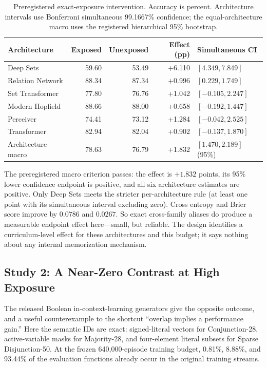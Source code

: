 \documentclass[twoside,11pt]{article}
\begin{document}
\begin{table}[t]
\caption{Preregistered exact-exposure intervention.  Accuracy is percent.
Architecture intervals use Bonferroni simultaneous 99.1667\% confidence; the
equal-architecture macro uses the registered hierarchical 95\% bootstrap.}
\label{tab:internal-models}
\centering
\small
\setlength{\tabcolsep}{5pt}
\begin{tabular}{lrrrl}
\toprule
Architecture & Exposed & Unexposed & Effect (pp) &
Simultaneous CI \\
\midrule
Deep Sets & 59.60 & 53.49 & +6.110 & $[4.349,7.849]$ \\
Relation Network & 88.34 & 87.34 & +0.996 & $[0.229,1.749]$ \\
Set Transformer & 77.80 & 76.76 & +1.042 & $[-0.105,2.247]$ \\
Modern Hopfield & 88.66 & 88.00 & +0.658 & $[-0.192,1.447]$ \\
Perceiver & 74.41 & 73.12 & +1.284 & $[-0.042,2.525]$ \\
Transformer & 82.94 & 82.04 & +0.902 & $[-0.137,1.870]$ \\
\midrule
Architecture macro & 78.63 & 76.79 & +1.832 &
$[1.470,2.189]$ (95\%) \\
\bottomrule
\end{tabular}
\end{table}

The preregistered macro criterion passes: the effect is $+1.832$ points,
its 95\% lower confidence endpoint is positive, and all six architecture
estimates are positive.  Only Deep Sets meets the stricter per-architecture
rule (at least one point with its simultaneous interval excluding zero).
Cross entropy and Brier score improve by $0.0786$ and $0.0267$.  So exact
cross-family aliases do produce a measurable endpoint effect here---small,
but reliable.  The design identifies a curriculum-level effect for these
architectures and this budget; it says nothing about any internal
memorization mechanism.

\subsection{Study 2: A Near-Zero Contrast at High Exposure}
\label{sec:boolean}

The released Boolean in-context-learning generators
\citep{bhattamishra2024understanding} give the opposite outcome, and a
useful counterexample to the shortcut ``overlap implies a performance
gain.''  Here the semantic IDs are exact: signed-literal vectors for
Conjunction-28, active-variable masks for Majority-28, and four-element
literal subsets for Sparse Disjunction-50.  At the frozen 640,000-episode
training budget, 0.81\%, 8.88\%, and 93.44\% of the evaluation functions
already occur in the original training streams.
\end{document}
